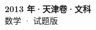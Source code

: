 \documentclass[zihao=-4, a4paper]{ctexart}
\begin{document}
\begin{center}
  {\Large\bfseries 2013 年·天津卷·文科}\\[4pt]
  {\large 数学 · 试题版}
\end{center}
\medskip
{}

\end{document}

